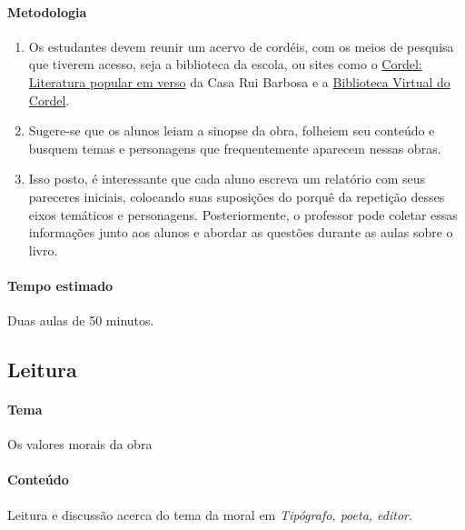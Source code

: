 \documentclass[12pt]{extarticle}
\begin{document}
\paragraph{Metodologia}

\begin{enumerate}

\item Os estudantes devem reunir um acervo de cordéis, com os meios de pesquisa
  que tiverem acesso, seja a biblioteca da escola, ou sites como
  o \href{http://www.casaruibarbosa.gov.br/cordel/acervo.html}{Cordel: Literatura popular em verso} 
  da Casa Rui Barbosa
  e a \href{http://cordel.edel.univ-poitiers.fr}{Biblioteca Virtual do Cordel}.

\item Sugere-se que os alunos leiam a sinopse da obra, folheiem seu conteúdo
  e busquem temas e personagens que frequentemente aparecem nessas obras. 

\item Isso posto, é interessante que cada aluno escreva um relatório com seus
  pareceres iniciais, colocando suas suposições do porquê da repetição desses
  eixos temáticos e personagens. Posteriormente, o professor pode coletar essas
  informações junto aos alunos e abordar as questões durante as aulas sobre
  o livro.

\end{enumerate}

\paragraph{Tempo estimado} Duas aulas de 50 minutos.




\subsection{Leitura}

\paragraph{Tema} Os valores morais da obra

\paragraph{Conteúdo} Leitura e discussão acerca do tema da moral em
\emph{Tipógrafo, poeta, editor}.
\end{document}
